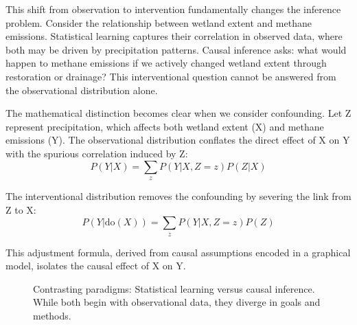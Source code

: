This shift from observation to intervention fundamentally changes the inference problem. Consider the relationship between wetland extent and methane emissions. Statistical learning captures their correlation in observed data, where both may be driven by precipitation patterns. Causal inference asks: what would happen to methane emissions if we actively changed wetland extent through restoration or drainage? This interventional question cannot be answered from the observational distribution alone.

The mathematical distinction becomes clear when we consider confounding. Let Z represent precipitation, which affects both wetland extent (X) and methane emissions (Y). The observational distribution conflates the direct effect of X on Y with the spurious correlation induced by Z:
\begin{equation}
P(Y|X) = \sum_z P(Y|X,Z=z)P(Z|X)
\end{equation}

The interventional distribution removes the confounding by severing the link from Z to X:
\begin{equation}
P(Y|\text{do}(X)) = \sum_z P(Y|X,Z=z)P(Z)
\end{equation}

This adjustment formula, derived from causal assumptions encoded in a graphical model, isolates the causal effect of X on Y.

\begin{figure}[h!]
\centering
{}
\caption{Contrasting paradigms: Statistical learning versus causal inference. While both begin with observational data, they diverge in goals and methods.}
\label{fig:paradigms}
\end{figure}


